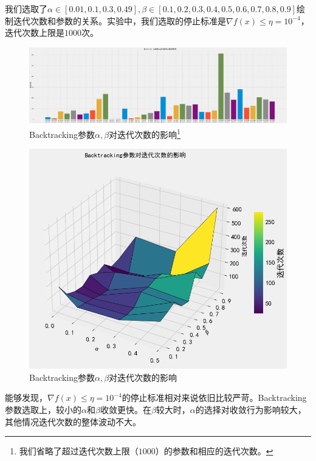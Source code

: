 \documentclass{homework}
\begin{document}
\begin{sol}
我们选取了$\alpha\in [0.01, 0.1, 0.3, 0.49], \beta\in[0.1, 0.2, 0.3, 0.4, 0.5, 0.6, 0.7, 0.8, 0.9]$绘制迭代次数和参数的关系。实验中，我们选取的停止标准是$\nabla f(x) \le \eta = 10^{-4}$，迭代次数上限是$1000$次。
\begin{figure}[h]
    \centering
    \includegraphics[width=1\linewidth]{4-3.png}
    \caption{Backtracking参数$\alpha, \beta$对迭代次数的影响\protect\footnote{我们省略了超过迭代次数上限（$1000$）的参数和相应的迭代次数。}}
\end{figure}
\begin{figure}[h]
    \centering
    \includegraphics[width=0.5\linewidth]{4-4.png}
    \caption{Backtracking参数$\alpha, \beta$对迭代次数的影响}
\end{figure}

能够发现，$\nabla f(x) \le \eta = 10^{-4}$的停止标准相对来说依旧比较严苛。Backtracking参数选取上，较小的$\alpha$和$\beta$收敛更快。在$\beta$较大时，$\alpha$的选择对收敛行为影响较大，其他情况迭代次数的整体波动不大。

\end{sol}

\question 
\end{document}
